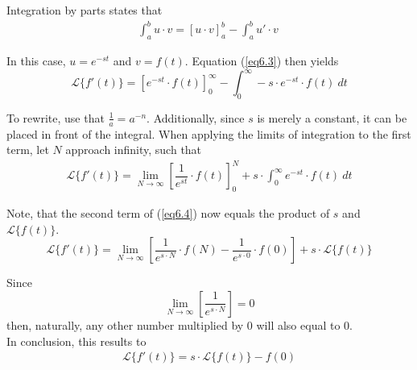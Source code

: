 \begin{tcolorbox}[colback=gray!5!white,colframe=gray!!black,title=Proof 6.1]
Integration by parts states that 
\begin{align}
\int_{a}^{b}{u\cdot v}=\left[u\cdot v\right]_{a}^{b}-\int_{a}^{b}u'\cdot v\
\label{eq6.3}
\end{align}

In this case, $u=e^{-st}$ and $v=f(t)$.
Equation (\ref{eq6.3}) then yields
$$\mathcal{L}\{f'(t)\}=\left[e^{-st}\cdot f(t)\right]_{0}^{\infty}-\int_{0}^{\infty} -s\cdot e^{-st}\cdot f(t)\ dt$$

To rewrite, use that $\frac{1}{a}=a^{-n}$. Additionally, since $s$ is merely a constant, it can be placed in front of the integral. When applying the limits of integration to the first term, let $N$ approach infinity, such that
\begin{align}
\mathcal{L}\{f'(t)\}=\lim_{N \to \infty}\left[\dfrac{1}{e^{st}}\cdot f(t)\right]_{0}^{N}+s\cdot \int_{0}^{\infty}e^{-st}\cdot f(t)\ dt
\label{eq6.4}
\end{align}

Note, that the second term of (\ref{eq6.4}) now equals the product of $s$ and $\mathcal{L}\{f(t)\}$. 
$$\mathcal{L}\{f'(t)\} = \lim_{N \to \infty}\left[\dfrac{1}{e^{s\cdot N}}\cdot f(N)-\dfrac{1}{e^{s\cdot 0}}\cdot f(0)\right]+s\cdot \mathcal{L}\{f(t)\}$$

Since $$\lim_{N \to \infty}\left[\dfrac{1}{e^{s\cdot N}}\right]=0$$ then, naturally, any other number multiplied by 0 will also equal to 0.\\
In conclusion, this results to
\begin{align*}
\mathcal{L}\{f'(t)\} = s\cdot \mathcal{L}\{f(t)\}-f(0)
\end{align*}
\end{tcolorbox}